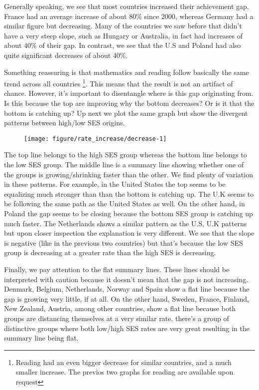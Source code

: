 \documentclass[11pt, a4paper]{article}\usepackage[]{graphicx}\usepackage[]{color}
\begin{document}
Generally speaking, we see that most countries increased their achievement gap. France had an average increase of about 80\% since 2000, whereas Germany had a similar figure but decreasing. Many of the countries we saw before that didn't have a very steep slope, such as Hungary or Australia, in fact had increases of about 40\% of their gap. In contrast, we see that the U.S and Poland had also quite significant decreases of about 40\%.



Something reassuring is that mathematics and reading follow basically the same trend across all countries \footnote{Reading had an even bigger decrease for similar countries, and a much smaller increase. The previos two graphs for reading are available upon request}. This means that the result is not an artifact of chance. However, it's important to disentangle where is this gap originating from. Is this because the top are improving why the bottom decreases? Or is it that the bottom is catching up? Up next we plot the same graph but show the divergent patterns between high/low SES origins.

\begin{figure}
\begin{center}


{\centering \texttt{[image: figure/rate\_increase/decrease-1]} 

}



\end{center}
\end{figure}

The top line belongs to the high SES group whereas the bottom line belongs to the low SES group. The middle line is a summary line showing whether one of the groups is growing/shrinking faster than the other. We find plenty of variation in these patterns. For example, in the United States the top seems to be equalizing much stronger than than the bottom is catching up. The U.K seems to be following the same path as the United States as well. On the other hand, in Poland the gap seems to be closing because the bottom SES group is catching up much faster. The Netherlands shows a similar pattern as the U.S, U.K patterns but upon closer inspection the explanation is very different. We see that the slope is negative (like in the previous two countries) but that's because the low SES group is decreasing at a greater rate than the high SES is decreasing.

Finally, we pay attention to the flat summary lines. These lines should be interpreted with caution because it doesn't mean that the gap is not increasing. Denmark, Belgium, Netherlands, Norway and Spain show a flat line because the gap is growing very little, if at all. On the other hand, Sweden, France, Finland, New Zealand, Austria, among other countries, show a flat line because both groups are distancing themselves at a very similar rate. there's a group of distinctive groups where both low/high SES rates are very great resulting in the summary line being flat.
\end{document}
